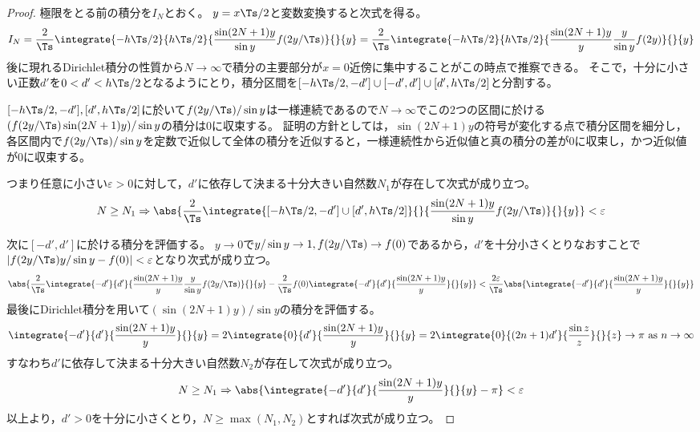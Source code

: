         \begin{proof}
            極限をとる前の積分を$I_N$とおく。
            $y = x \Ts/2$と変数変換すると次式を得る。
            \[
                I_N = \frac{2}{\Ts}\integrate{-h \Ts/2}{h \Ts/2}{\frac{\sin(2N+1)y}{\sin y}f(2y/\Ts)}{}{y} = \frac{2}{\Ts}\integrate{-h \Ts/2}{h \Ts/2}{\frac{\sin(2N+1)y}{y}\frac{y}{\sin y}f(2y)}{}{y}
            \]
            後に現れるDirichlet積分の性質から$N\to\infty$で積分の主要部分が$x=0$近傍に集中することがこの時点で推察できる。
            そこで，十分に小さい正数$d'$を$0<d'<h \Ts/2$となるようにとり，積分区間を$[-h \Ts/2,-d']\cup[-d',d']\cup[d',h \Ts/2]$と分割する。
            \par
            $[-h \Ts/2,-d'], [d',h \Ts/2]$に於いて$f(2y/\Ts)/\sin y$は一様連続であるので$N\to\infty$でこの2つの区間に於ける$(f(2y/\Ts)\sin(2N+1)y)/\sin y$の積分は0に収束する。
            証明の方針としては，$\sin(2N+1)y$の符号が変化する点で積分区間を細分し，各区間内で$f(2y/\Ts)/\sin y$を定数で近似して全体の積分を近似すると，一様連続性から近似値と真の積分の差が0に収束し，かつ近似値が0に収束する。
            \par
            つまり任意に小さい$\varepsilon>0$に対して，$d'$に依存して決まる十分大きい自然数$N_1$が存在して次式が成り立つ。
            \[
                N\geq N_1 \Rightarrow \abs{\frac{2}{\Ts}\integrate{[-h \Ts/2,-d']\cup[d',h \Ts/2]}{}{\frac{\sin(2N+1)y}{\sin y}f(2y/\Ts)}{}{y}}<\varepsilon
            \]
            \par
            次に$[-d',d']$に於ける積分を評価する。
            $y\to 0$で$y/\sin y\to 1,f(2y/\Ts)\to f(0)$であるから，$d'$を十分小さくとりなおすことで$|f(2y/\Ts)y/\sin y - f(0)| < \varepsilon$となり次式が成り立つ。
            \[
                \abs{\frac{2}{\Ts}\integrate{-d'}{d'}{\frac{\sin(2N+1)y}{y}\frac{y}{\sin y}f(2y/\Ts)}{}{y} - \frac{2}{\Ts}f(0)\integrate{-d'}{d'}{\frac{\sin(2N+1)y}{y}}{}{y}} < \frac{2\varepsilon}{\Ts}\abs{\integrate{-d'}{d'}{\frac{\sin(2N+1)y}{y}}{}{y}}
            \]
            最後にDirichlet積分を用いて$(\sin(2N+1)y)/\sin y$の積分を評価する。
            \[
                \integrate{-d'}{d'}{\frac{\sin(2N+1)y}{y}}{}{y} = 2\integrate{0}{d'}{\frac{\sin(2N+1)y}{y}}{}{y} = 2\integrate{0}{(2n+1)d'}{\frac{\sin z}{z}}{}{z} \to \pi \text{ as } n\to\infty
            \]
            すなわち$d'$に依存して決まる十分大きい自然数$N_2$が存在して次式が成り立つ。
            \[ N\geq N_1 \Rightarrow \abs{\integrate{-d'}{d'}{\frac{\sin(2N+1)y}{y}}{}{y} - \pi} < \varepsilon \]
            以上より，$d'>0$を十分に小さくとり，$N\geq\max(N_1,N_2)$とすれば次式が成り立つ。

\end{proof}

